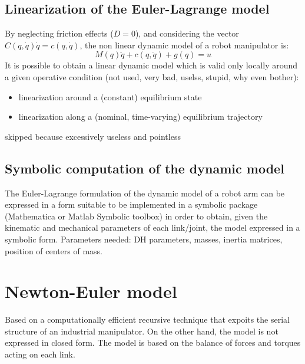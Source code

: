 \documentclass{book}
\begin{document}
\subsection{Linearization of the Euler-Lagrange model}
By neglecting friction effects ($D=0$), and considering the vector $C(q,\dot{q})\dot{q} = c(q,\dot{q})$, the non linear dynamic model of a robot manipulator is:
\[
    M(q)\ddot{q}+c(q,\dot{q})+g(q)=u
\]
It is possible to obtain a linear dynamic model which is valid only locally around a given operative condition (not used, very bad, uselss, stupid, why even bother):
\begin{itemize}
    \item linearization around a (constant) equilibrium state 
    \item linearization along a (nominal, time-varying) equilibrium trajectory
\end{itemize}
skipped because excessively useless and pointless


\subsection{Symbolic computation of the dynamic model}
The Euler-Lagrange formulation of the dynamic model of a robot arm can be expressed in a form suitable to be implemented in a symbolic package (Mathematica or Matlab Symbolic toolbox) in order to obtain, given the kinematic and mechanical parameters of each link/joint, the model expressed in a symbolic form. Parameters needed: DH parameters, masses, inertia matrices, position of centers of mass.





























\section{Newton-Euler model}
Based on a computationally efficient recursive technique that expoits the serial structure of an industrial manipulator. On the other hand, the model is not expressed in closed form.
The model is based on the balance of forces and torques acting on each link. 
\end{document}
